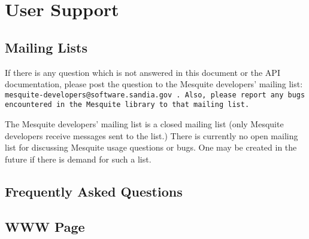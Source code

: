 \chapter{User Support}

\section{Mailing Lists}

If there is any question which is not answered in this document or the API
documentation, please post the question to the Mesquite developers' 
mailing list:  \tt{mesquite-developers@software.sandia.gov} .  Also,
please report any bugs encountered in the Mesquite library to that mailing
list.

The Mesquite developers' mailing list is a closed mailing list (only
Mesquite developers receive messages sent to the list.)  There is 
currently no open mailing list for discussing Mesquite usage questions
or bugs.  One may be created in the future if there is demand for such
a list.  

\section{Frequently Asked Questions}

\section{WWW Page}

